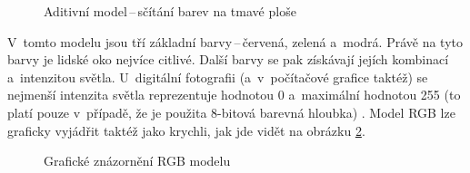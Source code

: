 \begin{figure}[h]
\begin{center}
\caption{ Aditivní model\,--\,sčítání barev na tmavé ploše \cite{rgb_monitor}}
\label{rgb_monitor_obraz}
\end{center}
\end{figure}

V~tomto modelu jsou tří základní barvy\,--\,červená, zelená a~modrá. Právě na tyto barvy je lidské oko nejvíce citlivé. Další barvy se pak získávají jejích kombinací a~intenzitou světla. U~digitální fotografii (a~v~počítačové grafice taktéž) se nejmenší intenzita světla reprezentuje hodnotou 0 a~maximální hodnotou 255 (to platí pouze v~případě, že je použita 8-bitová barevná hloubka) \cite{rgb_monitor}.
Model RGB lze graficky vyjádřit taktéž jako krychli, jak jde vidět na obrázku \ref{rgb_krychle_obraz}.

\begin{figure}[h]
\begin{center}
\caption{Grafické znázornění RGB modelu\cite{rgb_monitor}}
\label{rgb_krychle_obraz}
\end{center}
\end{figure}

